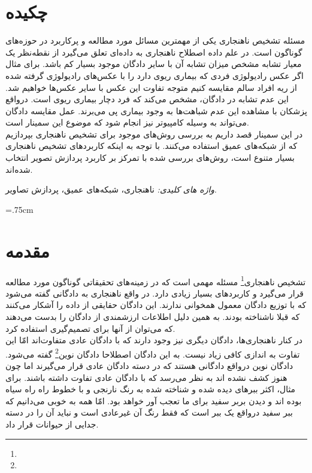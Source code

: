 \documentclass[12pt,a4paper]{article}
\theoremstyle{definition}
\theoremstyle{theorem}
\theoremstyle{definition}
\begin{document}
	\section*{چکیده}
	مسئله تشخیص ناهنجاری یکی از مهمترین مسائل مورد مطالعه و پر‌کاربرد در حوزه‌های گوناگون است.
	در علم داده اصطلاح ناهنجاری به داده‌ای تعلق می‌گیرد از نقطه‌نظر یک معیار
	تشابه مشخص میزان تشابه آن با سایر دادگان موجود بسیار کم باشد.
	برای مثال اگر عکس رادیولوژی فردی که بیماری ریوی دارد را با عکس‌های رادیولوژی گرفته شده از ریه افراد سالم مقایسه کنیم متوجه تفاوت
	این عکس با سایر عکس‌ها خواهیم شد. این عدم تشابه در دادگان، مشخص می‌کند  که فرد دچار بیماری ریوی است. درواقع پزشکان با مشاهده این عدم شباهت‌ها به
	وجود بیماری پی می‌برند. عمل مقایسه دادگان می‌تواند به وسیله کامپیوتر نیز انجام شود که موضوع این سمینار است.\\

	در این سمینار قصد داریم به بررسی روش‌های موجود برای تشخیص ناهنجاری بپردازیم که از شبکه‌های عمیق استفاده می‌کنند.
	با توجه به اینکه کاربر‌دهای تشخیص ناهنجاری بسیار متنوع است، روش‌های بررسی شده با تمرکز بر کاربرد پردازش تصویر انتخاب شده‌اند.

	\textit{واژه های کلیدی:}
	ناهنجاری،  شبکه‌های عمیق،  پردازش تصاویر.

	\newpage
	\baselineskip=1cm
	\tableofcontents
	\newpage
	\baselineskip=.75cm

	\section{مقدمه}

   تشخیص ناهنجاری‌\footnote{} مسئله مهمی است که در زمینه‌های تحقیقاتی گوناگون مورد مطالعه قرار می‌گیرد و کاربرد‌های بسیار زیادی دارد. در واقع ناهنجاری به دادگانی گفته می‌شود که با توزیع دادگان معمول همخوانی ندارند. این دادگان حقایقی از داده را آشکار می‌کنند که قبلا ناشناخته بودند. به همین دلیل اطلاعات ارزشمندی از دادگان را بدست می‌دهند که می‌توان از آنها برای تصمیم‌گیری‌ استفاده کرد.\\

در کنار ناهنجاری‌ها، دادگان دیگری نیز وجود دارند که با دادگان عادی متفاوت‌اند امّا این تفاوت به اندازی کافی زیاد نیست. به این دادگان اصطلاحا دادگان نوین\footnote{} گفته می‌شود. دادگان نوین درواقع دادگانی هستند که در دسته دادگان عادی قرار می‌گیرند اما چون هنوز کشف نشده اند به نظر می‌رسد که با دادگان عادی تفاوت داشته باشند. برای مثال، اکثر ببر‌های دیده شده و شناخته شده به رنگ نارنجی و با خطوط راه راه سیاه بوده اند و دیدن بربر سفید برای ما تعجب آور خواهد بود. امّا همه به خوبی می‌دانیم که ببر سفید درواقع یک ببر است که فقط رنگ آن غیرعادی است و نباید آن را در دسته جدایی از حیوانات قرار داد. \\
\end{document}
